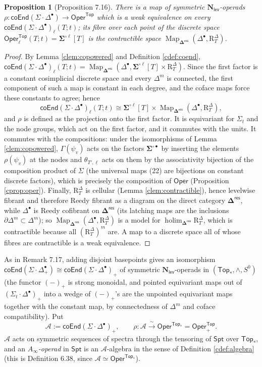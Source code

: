 \documentclass[12pt]{article}
\theoremstyle{plain}
\newtheorem{cproposition}[ctheorem]{Proposition}
\theoremstyle{definition}
\theoremstyle{remark}
\newcommand{\Cal}[1]{\mathcal{#1}}
\newcommand{\holim}{\operatorname{holim}}
\newcommand{\Nl}{\mathbf{N}_{\mathsf{lev}}}
\newcommand{\Oper}{\mathsf{Oper}}
\newcommand{\coend}[1]{\mathsf{coEnd}(#1)}
\newcommand{\bdel}{\mathbf{\Delta}}
\newcommand{\Dres}{\bdel^{\mathsf{res}}}
\newcommand{\SD}{\Sigma{\cdot}\Delta^{\bullet}}
\newcommand{\Spt}{\mathsf{Spt}}
\newcommand{\Top}{\mathsf{Top}_*}
\newcommand{\Map}{\operatorname{Map}}
\newcommand{\Rr}{\mathrm{R}}
\begin{document}
\begin{cproposition}[Proposition 7.16]\label{cprop:rho}
There is a map of symmetric $\Nl$-operads $\rho\colon\coend{\SD}\to\Oper^{\mathsf{Top}}$ which is a weak equivalence on every $\coend{\SD}_\ell(T;t)$; its fibre over each point of the discrete space $\Oper^{\mathsf{Top}}_\ell(T;t)=\mathbf\Sigma^{\circ\ell}[T]$ is the contractible space $\Map_{\Dres}(\Delta^\bullet,\Rr^\Delta_T)$.
\end{cproposition}

\begin{proof}
By Lemma \ref{clem:copowered} and Definition \ref{cdef:coend}, $\coend{\SD}_\ell(T;t)=\Map_{\Dres}(\Delta^\bullet,\mathbf\Sigma^{\circ\ell}[T]\times\Rr^\Delta_T)$. Since the first factor is a constant cosimplicial discrete space and every $\Delta^m$ is connected, the first component of such a map is constant in each degree, and the coface maps force these constants to agree; hence
\[\coend{\SD}_\ell(T;t)\cong\mathbf\Sigma^{\circ\ell}[T]\times\Map_{\Dres}(\Delta^\bullet,\Rr^\Delta_T),\]
and $\rho$ is defined as the projection onto the first factor. It is equivariant for $\Sigma_t$ and the node groups, which act on the first factor, and it commutes with the units. It commutes with the compositions: under the isomorphisms of Lemma \ref{clem:copowered}, $\Gamma(\psi_v)$ acts on the factors $\mathbf\Sigma^{\circ\bullet}$ by inserting the elements $\rho(\psi_v)$ at the nodes and $\theta_{T',\underline\ell}$ acts on them by the associativity bijection of the composition product of $\Sigma$ (the universal maps (22) are bijections on constant discrete factors), which is precisely the composition of $\Oper$ (Proposition \ref{cprop:oper}). Finally, $\Rr^\Delta_T$ is cellular (Lemma \ref{clem:contractible}), hence levelwise fibrant and therefore Reedy fibrant as a diagram on the direct category $\Dres$, while $\Delta^\bullet$ is Reedy cofibrant on $\Dres$ (its latching maps are the inclusions $\partial\Delta^m\subset\Delta^m$); so $\Map_{\Dres}(\Delta^\bullet,\Rr^\Delta_T)$ is a model for $\holim_{\Dres}\Rr^\Delta_T$, which is contractible because all $(\Rr^\Delta_T)^m$ are. A map to a discrete space all of whose fibres are contractible is a weak equivalence.
\end{proof}

As in Remark 7.17, adding disjoint basepoints gives an isomorphism $\coend{\SD_+}\cong\coend{\SD}_+$ of symmetric $\Nl$-operads in $(\Top,\wedge,S^0)$ (the functor $(-)_+$ is strong monoidal, and pointed equivariant maps out of $(\Sigma_t\cdot\Delta^\bullet)_+$ into a wedge of $(-)_+$'s are the unpointed equivariant maps together with the constant map, by connectedness of $\Delta^m$ and coface compatibility). Put
\[\Cal A:=\coend{\SD}_+,\qquad\rho\colon\Cal A\xrightarrow{\ \sim\ }\Oper^{\Top}=\Oper^{\mathsf{Top}}_+ .\]
$\Cal A$ acts on symmetric sequences of spectra through the tensoring of $\Spt$ over $\Top$, and an \emph{$A_\infty$-operad} in $\Spt$ is an $\Cal A$-algebra in the sense of Definition \ref{cdef:algebra} (this is Definition 6.38, since $\Cal A\simeq\Oper^{\Top}$).
\end{document}
